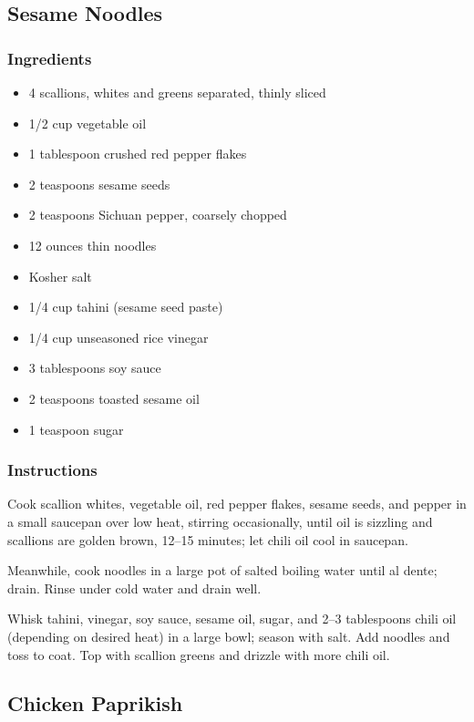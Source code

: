 \documentclass[11pt]{article}
\begin{document}
\subsection{Sesame Noodles}
\label{sec:orgd71dade}
\subsubsection{Ingredients}
\label{sec:orgb0e87d7}
\begin{itemize}
\item 4 scallions, whites and greens separated, thinly sliced
\item 1/2 cup vegetable oil
\item 1 tablespoon crushed red pepper flakes
\item 2 teaspoons sesame seeds
\item 2 teaspoons Sichuan pepper, coarsely chopped
\item 12 ounces thin noodles
\item Kosher salt
\item 1/4 cup tahini (sesame seed paste)
\item 1/4 cup unseasoned rice vinegar
\item 3 tablespoons soy sauce
\item 2 teaspoons toasted sesame oil
\item 1 teaspoon sugar
\end{itemize}
\subsubsection{Instructions}
\label{sec:org5522268}
Cook scallion whites, vegetable oil, red pepper flakes, sesame
seeds, and pepper in a small saucepan over low heat, stirring
occasionally, until oil is sizzling and scallions are golden
brown, 12–15 minutes; let chili oil cool in saucepan.

Meanwhile, cook noodles in a large pot of salted boiling water
until al dente; drain. Rinse under cold water and drain well.

Whisk tahini, vinegar, soy sauce, sesame oil, sugar, and 2–3
tablespoons chili oil (depending on desired heat) in a large bowl;
season with salt. Add noodles and toss to coat. Top with scallion
greens and drizzle with more chili oil.

\subsection{Chicken Paprikish}
\label{sec:orgc20ee7d}
\end{document}
